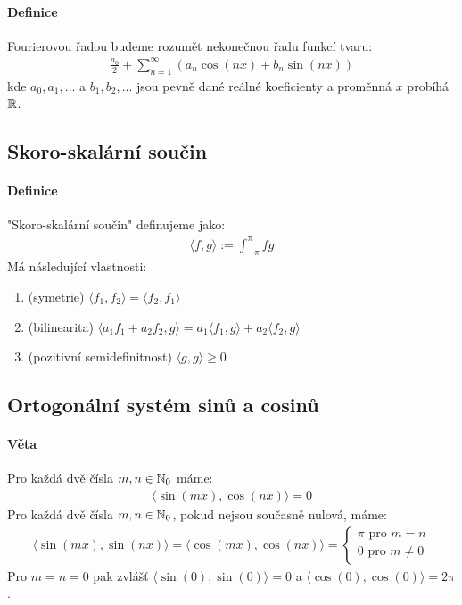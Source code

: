 \documentclass[a4paper,10pt]{article}
\begin{document}
\paragraph{Definice}
Fourierovou řadou budeme rozumět nekonečnou řadu funkcí tvaru:
\begin{align*}
	\frac{a_0}{2} + \sum_{n=1}^\infty( a_n \cos(nx) + b_n \sin(nx))
\end{align*}
kde $a_0, a_1, ...$ a $b_1, b_2, ...$ jsou pevně dané reálné koeficienty a
proměnná $x$ probíhá $\mathbb{R}$.

\subsection{Skoro-skalární součin}
\setcounter{equation}{0}
\paragraph{Definice}
"Skoro-skalární součin" definujeme jako:
\begin{align*}
	\langle f, g \rangle  := \int_{-\pi}^\pi fg
\end{align*}
Má následující vlastnosti:
\begin{enumerate}
	\item (symetrie) $\langle f_1, f_2 \rangle  = \langle f_2, f_1 \rangle $
	\item (bilinearita) $\langle a_1f_1 + a_2f_2, g \rangle  = a_1\langle f_1, g \rangle  + a_2\langle f_2, g \rangle $
	\item (pozitivní semidefinitnost) $\langle g,g \rangle  \ge 0$
\end{enumerate}


\subsection{Ortogonální systém sinů a cosinů}
\setcounter{equation}{0}
\paragraph{Věta}
Pro každá dvě čísla $m,n \in \mathbb{N}_0$ máme:
\begin{align*}
	\langle \sin(mx), \cos(nx)\rangle = 0	
\end{align*}
Pro každá dvě čísla $m,n \in \mathbb{N}_0$, pokud nejsou současně nulová, máme:
\begin{align*}
	\langle \sin(mx), \sin(nx) \rangle = \langle \cos(mx), \cos(nx) \rangle = 
	\begin{cases}
		\pi \text{ pro } m = n \\
		0 \text{ pro } m \neq 0
	\end{cases}
\end{align*}
Pro $m = n = 0$ pak zvlášť $\langle\sin(0), \sin(0)\rangle = 0$ a
$\langle\cos(0), \cos(0)\rangle = 2\pi$.
\end{document}
